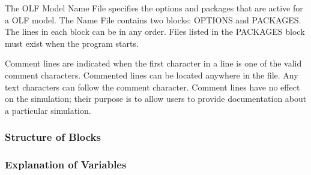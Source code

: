The OLF Model Name File specifies the options and packages that are active for a OLF model.  The Name File contains two blocks: OPTIONS  and PACKAGES. The lines in each block can be in any order.  Files listed in the PACKAGES block must exist when the program starts. 

Comment lines are indicated when the first character in a line is one of the valid comment characters.  Commented lines can be located anywhere in the file. Any text characters can follow the comment character. Comment lines have no effect on the simulation; their purpose is to allow users to provide documentation about a particular simulation. 

\vspace{5mm}
\subsubsection{Structure of Blocks}



\vspace{5mm}
\subsubsection{Explanation of Variables}
\begin{description}

\end{description}

